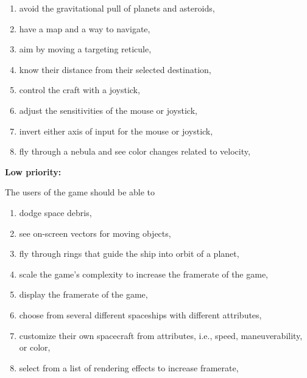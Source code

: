 \begin{multicols}{2}
\begin{enumerate}

  \item avoid the gravitational pull of planets and asteroids, 

  \item have a map and a way to navigate,

  \item aim by moving a targeting reticule,

  \item know their distance from their selected destination,

  \item control the craft with a joystick,

  \item adjust the sensitivities of the mouse or joystick,

  \item invert either axis of input for the mouse or joystick,

  \item fly through a nebula and see color changes related to velocity,

\end{enumerate}
\end{multicols}

\noindent \textbf{Low priority:}

The users of the game should be able to

\begin{multicols}{2}
\begin{enumerate}

  \item dodge space debris,

  \item see on-screen vectors for moving objects,

  \item fly through rings that guide the ship into orbit of a planet,

  \item scale the game's complexity to increase the framerate of the game,

  \item display the framerate of the game,

  \item choose from several different spaceships with different attributes,

  \item customize their own spacecraft from attributes, i.e., speed, maneuverability, or color,

  \item select from a list of rendering effects to increase framerate,

\end{enumerate}
\end{multicols}

